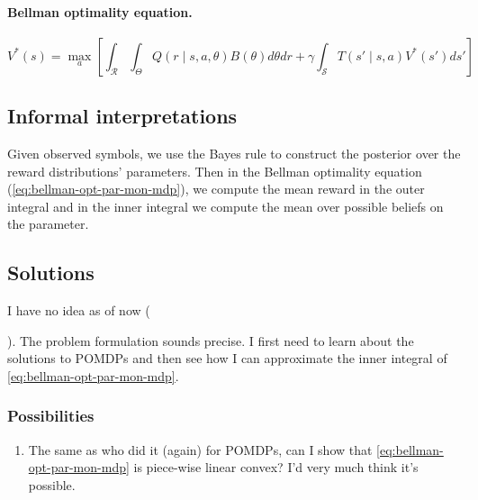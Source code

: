 \documentclass[a4paper]{article}
\theoremstyle{definition}
\newcommand{\cS}{\mathcal{S}}
\newcommand{\cR}{\mathcal{R}}
\begin{document}
\paragraph{Bellman optimality equation.}
%
\begin{equation}
\label{eq:bellman-opt-par-mon-mdp}
    V^*(s) = \max_a \left[\int_{\cR}\int_\Theta Q(r \mid s, a, \theta) B(\theta) d\theta dr + \gamma\int_\cS T\left(s' \mid s, a\right) V^*\left(s'\right)ds' \right]
\end{equation}

\subsection{Informal interpretations}
Given observed symbols, we use the Bayes rule to construct the posterior over the reward distributions' parameters. Then in the Bellman optimality equation (\cref{eq:bellman-opt-par-mon-mdp}), we compute the mean reward in the outer integral and in the inner integral we compute the mean over possible beliefs on the parameter.

\subsection{Solutions}
I have no idea as of now (\date{\today}). The problem formulation sounds precise. I first need to learn about the solutions to POMDPs and then see how I can approximate the inner integral of \cref{eq:bellman-opt-par-mon-mdp}.

\subsubsection{Possibilities}
\begin{enumerate}
    \item The same as \citet{porta2006pointbased} who did it (again) for POMDPs, can I show that \cref{eq:bellman-opt-par-mon-mdp} is piece-wise linear convex? I'd very much think it's possible.
\end{enumerate}


\end{document}
